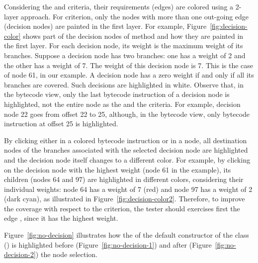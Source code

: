 Considering the  and 
criteria, their requirements (\DUG edges) are colored using a
2-layer approach. For  criterion, only the nodes
with more than one out-going edge (decision nodes) are painted in
the first layer. For example, Figure~\ref{fig:decision-color}
shows part of the decision nodes of method
 and how they are painted in the first
layer. For each decision node, its weight is the maximum weight of
its branches. Suppose a decision node has two branches: one has a
weight of 2 and the other has a weight of 7. The weight of this
decision node is 7. This is the case of \DUG node 61, in our
example. A decision node has a zero weight if and only if all its
branches are covered. Such decisions are highlighted in white.
Observe that, in the bytecode view, only the last bytecode
instruction of a decision node is highlighted, not the entire node
as the  and the  criteria. For
example, \DUG decision node 22 goes from offset 22 to 25,
although, in the bytecode view, only bytecode instruction at
offset 25 is highlighted.



By clicking either in a colored bytecode instruction or in a \DUG
node, all destination nodes of the branches associated with the
selected decision node are highlighted and the decision node
itself changes to a different color. For example, by clicking on
the decision node with the highest weight (node 61 in the
example), its children (nodes 64 and 97) are highlighted in
different colors, considering their individual weights: node 64
has a weight of 7 (red) and node 97 has a weight of 2 (dark cyan),
as illustrated in Figure~\ref{fig:decision-color2}. Therefore, to
improve the coverage with respect to the 
criterion, the tester should exercises first the edge
, since it has the highest weight.



Figure~\ref{fig:no-decision} illustrates how the \DUG of the
default constructor of the class 
() is highlighted before
(Figure~\ref{fig:no-decision-1}) and after
(Figure~\ref{fig:no-decision-2}) the node selection.

